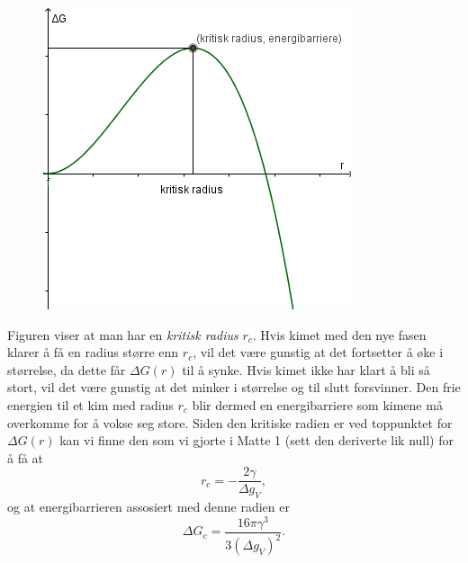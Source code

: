 \begin{figure}[H]
	\centering
	\includegraphics[width=\linewidth]{nucl.png}
	\label{fig:nucl}
\end{figure}
Figuren viser at man har en \emph{kritisk radius} $r_c$. Hvis kimet med den nye fasen klarer å få en radius større enn $r_c$, vil det være gunstig at det fortsetter å øke i størrelse, da dette får $\Delta G(r)$ til å synke. Hvis kimet ikke har klart å bli så stort, vil det være gunstig at det minker i størrelse og til slutt forsvinner. Den frie energien til et kim med radius $r_c$ blir dermed en energibarriere som kimene må overkomme for å vokse seg store. Siden den kritiske radien er ved toppunktet for $\Delta G(r)$ kan vi finne den som vi gjorte i Matte 1 (sett den deriverte lik null) for å få at
\begin{equation}
	r_c=-\frac{2\gamma}{\Delta g_V},
\end{equation}
og at energibarrieren assosiert med denne radien er
\begin{equation}
	\Delta G_c = \frac{16\pi\gamma^3}{3(\Delta g_V)^2}.
\end{equation}

